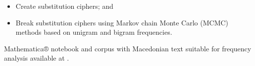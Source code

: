 \documentclass[10pt,letterpaper]{article}%
\begin{document}
\begin{minipage}[t]{.4\textwidth}
\begin{description}
    \begin{itemize}%
      [%
      nosep,leftmargin=*,%
      before=\leavevmode\vspace*{-\dimexpr2\topsep+\baselineskip\relax}%
      ]
    \item Create substitution ciphers; and
    \item Break substitution ciphers using Markov chain Monte Carlo (MCMC)
      methods based on unigram and bigram frequencies.
    \end{itemize}
    Mathematica® notebook and corpus with Macedonian text suitable for frequency
    analysis available at .
  \end{description}
\end{minipage}
\end{document}
